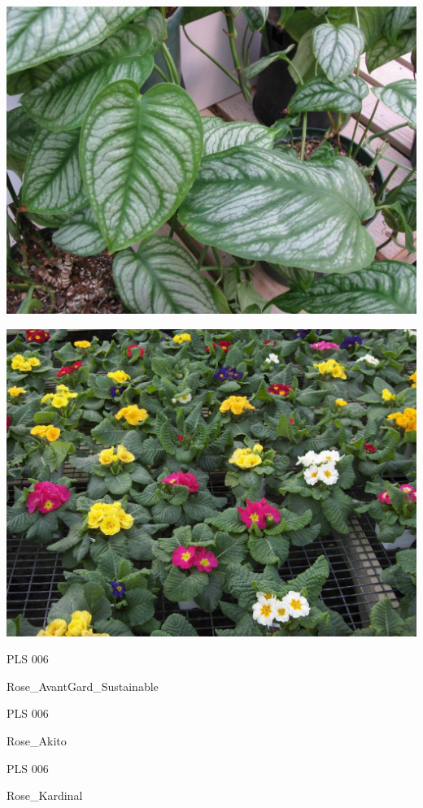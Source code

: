 \documentclass{article}
\begin{document}
\begin{center}
\includegraphics[height=0.925\paperheight]{../Philodendron_Silverqueen.jpg}
\end{center}
\newpage

\begin{center}
\includegraphics[height=0.925\paperheight]{../Primula.jpg}
\end{center}
\newpage

\noindent  PLS 006
\vfill
\centerline{{\huge Rose\_AvantGard\_Sustainable }}
\vfill
\newpage

\noindent  PLS 006
\vfill
\centerline{{\huge Rose\_Akito }}
\vfill
\newpage

\noindent  PLS 006
\vfill
\centerline{{\huge Rose\_Kardinal }}
\vfill
\newpage
\end{document}
